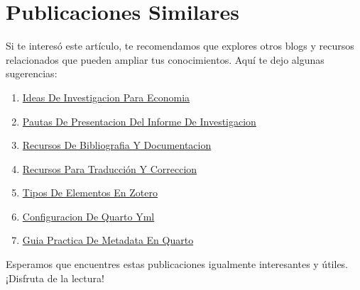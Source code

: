 \documentclass[
  jou,
  floatsintext,
  longtable,
  a4paper,
  nolmodern,
  notxfonts,
  notimes,
  12pt,
  colorlinks=true,linkcolor=blue,citecolor=blue,urlcolor=blue]{apa7}
\providecommand{\tightlist}{%
  \setlength{\itemsep}{0pt}\setlength{\parskip}{0pt}}
\begin{document}
\appendix

\section{Publicaciones Similares}\label{apx-publicaciones-similares}

\setlength{\parindent}{1em}

Si te interesó este artículo, te recomendamos que explores otros blogs y
recursos relacionados que pueden ampliar tus conocimientos. Aquí te dejo
algunas sugerencias:

\begin{enumerate}
\def\labelenumi{\arabic{enumi}.}
\tightlist
\item
  \href{https://methodica.netlify.app/posts/2023-06-03-ideas-de-investigacion-para-economia/index.pdf}{}
  \href{https://methodica.netlify.app/posts/2023-06-03-ideas-de-investigacion-para-economia}{Ideas
  De Investigacion Para Economia}
\item
  \href{https://methodica.netlify.app/posts/2023-06-03-pautas-de-presentacion-del-informe-de-investigacion/index.pdf}{}
  \href{https://methodica.netlify.app/posts/2023-06-03-pautas-de-presentacion-del-informe-de-investigacion}{Pautas
  De Presentacion Del Informe De Investigacion}
\item
  \href{https://methodica.netlify.app/posts/2025-01-12-recursos-de-bibliografia-y-documentacion/index.pdf}{}
  \href{https://methodica.netlify.app/posts/2025-01-12-recursos-de-bibliografia-y-documentacion}{Recursos
  De Bibliografia Y Documentacion}
\item
  \href{https://methodica.netlify.app/posts/2025-02-09-recursos-para-traducción-y-correccion/index.pdf}{}
  \href{https://methodica.netlify.app/posts/2025-02-09-recursos-para-traducción-y-correccion}{Recursos
  Para Traducción Y Correccion}
\item
  \href{https://methodica.netlify.app/posts/2025-04-23-tipos-de-elementos-en-zotero/index.pdf}{}
  \href{https://methodica.netlify.app/posts/2025-04-23-tipos-de-elementos-en-zotero}{Tipos
  De Elementos En Zotero}
\item
  \href{https://methodica.netlify.app/posts/2026-01-02-configuracion-de-quarto-yml/index.pdf}{}
  \href{https://methodica.netlify.app/posts/2026-01-02-configuracion-de-quarto-yml}{Configuracion
  De Quarto Yml}
\item
  \href{https://methodica.netlify.app/posts/2026-01-02-guia-practica-de-metadata-en-quarto/index.pdf}{}
  \href{https://methodica.netlify.app/posts/2026-01-02-guia-practica-de-metadata-en-quarto}{Guia
  Practica De Metadata En Quarto}
\end{enumerate}

Esperamos que encuentres estas publicaciones igualmente interesantes y
útiles. ¡Disfruta de la lectura!
\end{document}
